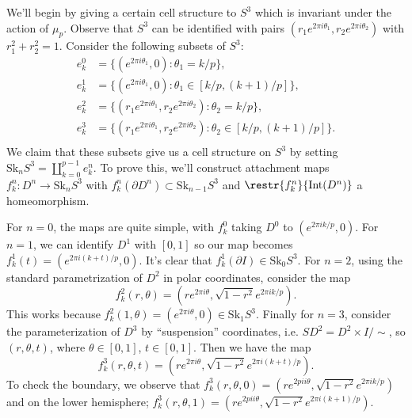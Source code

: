 \documentclass[11pt,letterpaper]{article}
\providecommand{\Sk}{\text{Sk}}
\begin{document}
\begin{solution}
    \quad We'll begin by giving a certain cell structure to $S^3$ which is invariant under the action of $\mu_p$. Observe that $S^3$ can be identified with pairs $(r_1e^{2\pi i \theta_1}, r_2 e^{2\pi i \theta_2})$ with $r_1^2+r_2^2=1$. Consider the following subsets of $S^3$:
    \[
        \begin{aligned}
            e_k^0 &= \{(e^{2\pi i \theta_1}, 0) : \theta_1 = k / p\},\\
            e_k^1 &= \{(e^{2\pi i \theta_1}, 0) : \theta_1 \in [k / p, (k+1) / p]\},\\
            e_k^2 &= \{(r_1e^{2\pi i \theta_1}, r_2e^{2\pi i \theta_2}) : \theta_2 = k / p\},\\
            e_k^3 &= \{(r_1e^{2\pi i \theta_1}, r_2e^{2\pi i \theta_2}) : \theta_2 \in [k / p, (k+1) / p]\}.\\
        \end{aligned}
    \]
    We claim that these subsets give us a cell structure on $S^3$ by setting $\Sk_n S^3 = \coprod_{k=0}^{p-1} e_k^n$. To prove this, we'll construct attachment maps $f_k^n : D^n \to \Sk_n S^3$ with $f_k^n(\partial D^n) \subset \Sk_{n-1}S^3$ and $\restr{f_k^n}{\text{Int}(D^n)}$ a homeomorphism. 

    \quad For $n=0$, the maps are quite simple, with $f_k^0$ taking $D^0$ to $(e^{2\pi i k / p}, 0)$. For $n=1$, we can identify $D^1$ with $[0,1]$ so our map becomes $f_k^1(t) = (e^{2\pi i (k+t) / p}, 0)$. It's clear that $f_k^1(\partial I)\in \Sk_0S^3$. For $n=2$, using the standard parametrization of $D^2$ in polar coordinates, consider the map
    \[
        f_k^2(r,\theta) = \left(re^{2\pi i \theta}, \sqrt{1-r^2}e^{2\pi i k / p}\right)
    .\]  
    This works because $f^2_k(1,\theta) = (e^{2\pi i \theta},0) \in \Sk_1S^3$. Finally for $n=3$, consider the parameterization of $D^3$ by ``suspension'' coordinates, i.e. $SD^2=D^2\times I / \sim$, 
    so $(r, \theta, t)$, where $\theta\in [0,1]$, $t\in [0,1]$. Then we have the map
    \[
        f_k^3(r,\theta,t) = \left(r e^{2\pi i \theta}, \sqrt{1-r^2}e^{2\pi i (k+t) / p}\right)
    .\]  
    To check the boundary, we observe that $f^3_k(r,\theta,0) = (re^{2pi i \theta}, \sqrt{1-r^2}e^{2\pi i k /p})$ and on the lower hemisphere; $f^3_k(r,\theta,1) = (re^{2pi i \theta}, \sqrt{1-r^2}e^{2\pi i (k+1) /p})$.


\end{solution}
\end{document}
